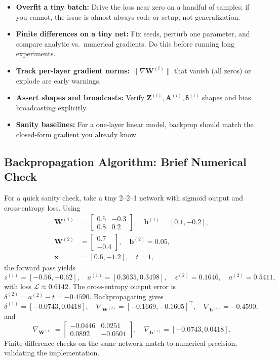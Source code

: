 \begin{tcolorbox}[summarybox, title={Debugging and gradient-check checklist}]
\begin{itemize}
    \item \textbf{Overfit a tiny batch:} Drive the loss near zero on a handful of samples; if you cannot, the issue is almost always code or setup, not generalization.
    \item \textbf{Finite differences on a tiny net:} Fix seeds, perturb one parameter, and compare analytic vs.\ numerical gradients. Do this before running long experiments.
    \item \textbf{Track per-layer gradient norms:} \(\|\nabla \mathbf{W}^{(l)}\|\) that vanish (all zeros) or explode are early warnings.
    \item \textbf{Assert shapes and broadcasts:} Verify \(\mathbf{Z}^{(l)}, \mathbf{A}^{(l)}, \boldsymbol{\delta}^{(l)}\) shapes and bias broadcasting explicitly.
    \item \textbf{Sanity baselines:} For a one-layer linear model, backprop should match the closed-form gradient you already know.
\end{itemize}
\end{tcolorbox}

\subsection{Backpropagation Algorithm: Brief Numerical Check}
\label{sec:backprop_backpropagation_algorithm_brief_numerical_check}

For a quick sanity check, take a tiny 2--2--1 network with sigmoid output and cross\hyp{}entropy loss. Using
\begin{align*}
\mathbf{W}^{(1)}&=\begin{bmatrix}0.5&-0.3\\0.8&0.2\end{bmatrix},\quad \mathbf{b}^{(1)}=[0.1,-0.2],\\
\mathbf{W}^{(2)}&=\begin{bmatrix}0.7\\-0.4\end{bmatrix},\quad \mathbf{b}^{(2)}=0.05,\\
\mathbf{x}&=[0.6,-1.2],\quad t=1,
\end{align*}
the forward pass yields
\[
z^{(1)}=[-0.56,-0.62],\quad
a^{(1)}=[0.3635,0.3498],\quad
z^{(2)}=0.1646,\quad
a^{(2)}=0.5411,
\]
with loss \(\mathcal{L}\approx 0.6142\). The cross\hyp{}entropy output error is \(\delta^{(2)}=a^{(2)}-t=-0.4590\). Backpropagating gives
\[
\delta^{(1)}=[-0.0743,0.0418],\quad
\nabla_{\mathbf{W}^{(2)}}=[-0.1669,-0.1605]^\top,\quad
\nabla_{\mathbf{b}^{(2)}}=-0.4590,
\]
and
\[
\nabla_{\mathbf{W}^{(1)}}=
\begin{bmatrix}
-0.0446&0.0251\\
0.0892&-0.0501
\end{bmatrix},\quad
\nabla_{\mathbf{b}^{(1)}}=[-0.0743,0.0418].
\]
Finite-difference checks on the same network match to numerical precision, validating the implementation.

